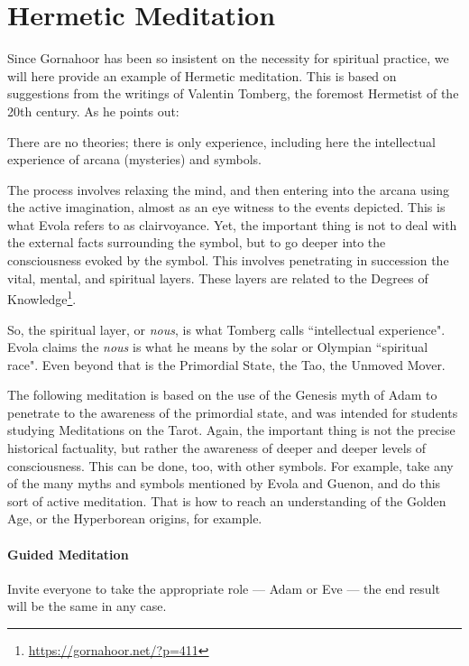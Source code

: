 \section{Hermetic Meditation}

\label{sec:HermeticMeditation}

Since Gornahoor has been so insistent on the necessity for spiritual practice, we will here provide an example of Hermetic meditation. This is based on suggestions from the writings of Valentin Tomberg, the foremost Hermetist of the 20th century. As he points out:

\begin{quotex}
There are no theories; there is only experience, including here the intellectual experience of arcana (mysteries) and symbols.

\end{quotex}
The process involves relaxing the mind, and then entering into the arcana using the active imagination, almost as an eye witness to the events depicted. This is what Evola refers to as clairvoyance. Yet, the important thing is not to deal with the external facts surrounding the symbol, but to go deeper into the consciousness evoked by the symbol. This involves penetrating in succession the vital, mental, and spiritual layers. These layers are related to the Degrees of Knowledge\footnote{\url{https://gornahoor.net/?p=411}}.

So, the spiritual layer, or \emph{nous}, is what Tomberg calls ``intellectual experience". Evola claims the \emph{nous} is what he means by the solar or Olympian ``spiritual race". Even beyond that is the Primordial State, the Tao, the Unmoved Mover.

The following meditation is based on the use of the Genesis myth of Adam to penetrate to the awareness of the primordial state, and was intended for students studying Meditations on the Tarot. Again, the important thing is not the precise historical factuality, but rather the awareness of deeper and deeper levels of consciousness. This can be done, too, with other symbols. For example, take any of the many myths and symbols mentioned by Evola and Guenon, and do this sort of active meditation. That is how to reach an understanding of the Golden Age, or the Hyperborean origins, for example.

\paragraph{Guided Meditation}
Invite everyone to take the appropriate role — Adam or Eve — the end result will be the same in any case.

